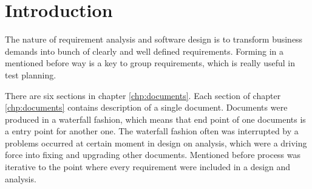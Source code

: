 \chapter{Introduction}
	The nature of requirement analysis and software design is to transform business demands into bunch of clearly and well defined requirements. Forming in a mentioned before way is a key to group requirements, which is really useful in test planning. 
	
	There are six sections in chapter \ref{chp:documents}.	Each section of chapter \ref{chp:documents} contains description of a single document. Documents were produced in a waterfall fashion, which means that end point of one documents is a entry point for another one. The waterfall fashion often was interrupted by a problems occurred at certain moment in design on analysis, which were a driving force into fixing and upgrading other documents. Mentioned before process was iterative to the point where every requirement were included in a design and analysis.